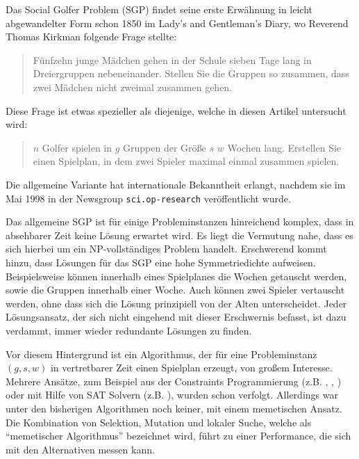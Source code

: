 Das Social Golfer Problem (SGP) findet seine erste Erwähnung in leicht abgewandelter Form schon 1850 im Lady's and Gentleman's Diary, wo Reverend Thomas Kirkman folgende Frage stellte:

\begin{quote}
Fünfzehn junge Mädchen gehen in der Schule sieben Tage lang in Dreiergruppen nebeneinander. Stellen Sie die Gruppen so zusammen, dass zwei Mädchen nicht zweimal zusammen gehen.
\end{quote}
Diese Frage ist etwas spezieller als diejenige, welche in diesen Artikel untersucht wird:
\begin{quote}
$n$ Golfer spielen in $g$ Gruppen der Größe $s$ $w$ Wochen lang. Erstellen Sie einen Spielplan, in dem zwei Spieler maximal einmal zusammen spielen.
\end{quote}
Die allgemeine Variante hat internationale Bekanntheit erlangt, nachdem sie im Mai 1998 in der Newsgroup \texttt{sci.op-research} veröffentlicht wurde.

Das allgemeine SGP ist für einige Probleminstanzen hinreichend komplex, dass in absehbarer Zeit keine Lösung erwartet wird. Es liegt die Vermutung nahe, dass es sich hierbei um ein NP-vollständiges Problem handelt.
Erschwerend kommt hinzu, dass Lösungen für das SGP eine hohe Symmetriedichte aufweisen. 
Beispielsweise können innerhalb eines Spielplanes die Wochen getauscht werden, sowie die Gruppen innerhalb einer Woche. 
Auch können zwei Spieler vertauscht werden, ohne dass sich die Lösung prinzipiell von der Alten unterscheidet. 
Jeder Lösungsansatz, der sich nicht eingehend mit dieser Erschwernis befasst, ist dazu verdammt, immer wieder redundante Lösungen zu finden.

Vor diesem Hintergrund ist ein Algorithmus, der für eine Probleminstanz $(g,s,w)$ in vertretbarer Zeit einen Spielplan erzeugt, von großem Interesse.
Mehrere Ansätze, zum Beispiel aus der Constraints Programmierung (z.B. \cite{fahle01}, \cite{smith01}, \cite{sellmann02}) oder mit Hilfe von SAT Solvern (z.B. \cite{triska08}), 
wurden schon verfolgt. Allerdings war unter den bisherigen Algorithmen noch keiner, mit einem memetischen Ansatz.
Die Kombination von Selektion, Mutation und lokaler Suche, welche als \enquote{memetischer Algorithmus} bezeichnet wird, führt zu einer Performance, die sich mit den Alternativen messen kann.


